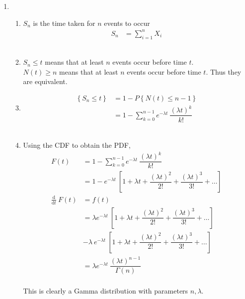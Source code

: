 \begin{enumerate}
	
	\item 
			
		\begin{enumerate}
			\item $ S_n $ is the time taken for $ n $ events to occur
			\begin{align}
				S_n &= \sum\limits_{i=1}^{n} X_i
			\end{align}\\
			
			\item $ S_n \leq t $ means that at least $ n $ events occur before time $ t $. \\
			$ N(t) \geq n $ means that at least $ n $ events occur before time $ t $. Thus they are equivalent.\\
			
			\item 
			\begin{align}
				\left\{S_n \leq t\right\} &= 1 - P \left\{N(t) \leq n-1\right\} \nonumber \\
				&= 1 - \sum\limits_{k=0}^{n-1} e^{-\lambda t}\ \dfrac{(\lambda t)^k}{k!}
			\end{align}\\
			
			\item Using the CDF to obtain the PDF,\\
			\begin{align}
				F(t) &=  1 - \sum\limits_{k=0}^{n-1} e^{-\lambda t}\ \dfrac{(\lambda t)^k}{k!} \nonumber \\
				&=  1 - e^{-\lambda t}\ \left[1 + \lambda t + \dfrac{(\lambda t)^2}{2!} + \dfrac{(\lambda t)^3}{3!} + \dots\right] \nonumber \\
				\frac{\mathrm{d}}{\mathrm{d}t}\ F(t) &= f(t) \nonumber \\
				&= \lambda e^{-\lambda t}\ \left[1 + \lambda t + \dfrac{(\lambda t)^2}{2!} + \dfrac{(\lambda t)^3}{3!} + \dots\right] \nonumber \\
				&- \lambda\ e^{-\lambda t}\ \left[1 + \lambda t + \dfrac{(\lambda t)^2}{2!} + \dfrac{(\lambda t)^3}{3!} + \dots\right] \\
				&= \lambda e^{-\lambda t}\ \dfrac{(\lambda t)^{n-1}}{\Gamma (n)}
			\end{align}\\
			This is clearly a Gamma distribution with parameters $ n, \lambda $.\\
		\end{enumerate}
	

\end{enumerate}
